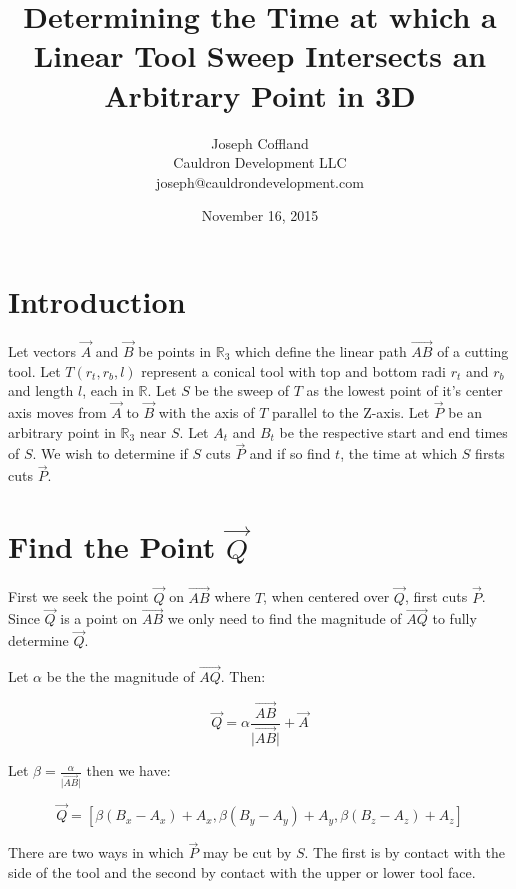 \documentclass{article}
\title{
  Determining the Time at which a Linear Tool Sweep Intersects an Arbitrary
  Point in 3D
}
\date{November 16, 2015}
\author{
  Joseph Coffland\\
  Cauldron Development LLC\\
  joseph@cauldrondevelopment.com
}
\newcommand{\norm}[1]{\lvert #1 \rvert}
\begin{document}
\maketitle

\section{Introduction}
Let vectors $\vec{A}$ and $\vec{B}$ be points in $\mathbb{R}_3$ which define
the linear path $\vec{AB}$ of a cutting tool.  Let $T(r_t,r_b,l)$ represent a
conical tool with top and bottom radi $r_t$ and $r_b$ and length $l$, each in
$\mathbb{R}$.  Let $S$ be the sweep of $T$ as the lowest point of it's center
axis moves from $\vec{A}$ to $\vec{B}$ with the axis of $T$ parallel to the
Z-axis.  Let $\vec{P}$ be an arbitrary point in $\mathbb{R}_3$ near $S$. Let
$A_t$ and $B_t$ be the respective start and end times of $S$.  We wish to
determine if $S$ cuts $\vec{P}$ and if so find $t$, the time at which $S$
firsts cuts $\vec{P}$.

\begin{figure}[!h]
  \centering
  \def\svgwidth{0.5\textwidth}
  
\end{figure}

\section{Find the Point $\vec{Q}$}
First we seek the point $\vec{Q}$ on $\vec{AB}$ where $T$, when centered over
$\vec{Q}$, first cuts $\vec{P}$.  Since $\vec{Q}$ is a point on $\vec{AB}$ we
only need to find the magnitude of $\vec{AQ}$ to fully determine $\vec{Q}$.

Let $\alpha$ be the the magnitude of $\vec{AQ}$.  Then:

\begin{equation*}
\vec{Q} = \alpha \frac{\vec{AB}}{\norm{\vec{AB}}} + \vec{A}
\end{equation*}

Let $\beta = \frac{\alpha}{\norm{\vec{AB}}}$ then we have:

\begin{equation}
\vec{Q} =
[\beta (B_x - A_x) + A_x, \beta (B_y - A_y) + A_y, \beta (B_z - A_z) + A_z]
\end{equation}

There are two ways in which $\vec{P}$ may be cut by $S$.  The first is by
contact with the side of the tool and the second by contact with the upper
or lower tool face.
\end{document}
